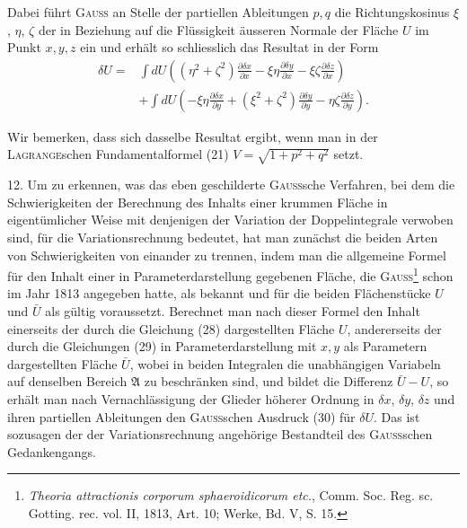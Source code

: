 Dabei führt \textsc{Gauss} an Stelle der partiellen Ableitungen $p,q$ die Richtungskosinus
$\xi$, $\eta$, $\zeta$ der in Beziehung auf die Flüssigkeit äusseren Normale der
Fläche $U$ im Punkt $x,y,z$ ein und erhält so schliesslich das Resultat in der
Form
\begin{equation*}
\begin{aligned}
\delta U={}&\int dU\left((\eta^2+\zeta^2)\frac{\partial\delta x}{\partial x}-\xi\eta\frac{\partial\delta y}{\partial x}-\xi\zeta\frac{\partial\delta z}{\partial x}\right)\\
&+\int dU\left(-\xi\eta\frac{\partial\delta x}{\partial y}+(\xi^2+\zeta^2)\frac{\partial\delta y}{\partial y}-\eta\zeta\frac{\partial\delta z}{\partial y}\right).
\end{aligned}\tag{30}
\end{equation*}

Wir bemerken, dass sich dasselbe Resultat ergibt, wenn man in der \textsc{Lagrange}schen
Fundamentalformel (21) $V=\sqrt{1+p^2+q^2}$ setzt.
\par\clearpage{}
\noindent\hspace*{\parindent}12. Um zu erkennen, was das eben geschilderte \textsc{Gauss}sche Verfahren,
bei dem die Schwierigkeiten der Berechnung des Inhalts einer krummen Fläche
in eigentümlicher Weise mit denjenigen der Variation der Doppelintegrale
verwoben sind, für die  Variationsrechnung bedeutet, hat man
zunächst die beiden Arten von Schwierigkeiten von einander zu trennen, indem
man die allgemeine Formel für den Inhalt einer in Parameterdarstellung gegebenen
Fläche, die \textsc{Gauss}\footnote{\textit{Theoria attractionis corporum sphaeroidicorum etc.}, Comm. Soc. Reg. sc. Gotting. rec. vol. II, 1813, Art. 10; Werke, Bd. V, S. 15.} schon im Jahr 1813 angegeben hatte, als bekannt
und für die beiden Flächenstücke $U$ und $\bar U$ als gültig voraussetzt. Berechnet
man nach dieser Formel den Inhalt einerseits der durch die Gleichung
(28) dargestellten Fläche $U$, andererseits der durch die Gleichungen (29) in
Parameterdarstellung mit $x,y$ als Parametern dargestellten Fläche $\bar U$, wobei
in beiden Integralen die unabhängigen Variabeln auf denselben Bereich $\mathfrak{A}$ zu
beschränken sind, und bildet die Differenz $\bar U-U$, so erhält man nach Vernachlässigung
der Glieder höherer Ordnung in $\delta x$, $\delta y$, $\delta z$ und ihren partiellen
Ableitungen den \textsc{Gauss}schen Ausdruck (30) für $\delta U$. Das ist sozusagen der
der Variationsrechnung angehörige Bestandteil des \textsc{Gauss}schen Gedankengangs.

